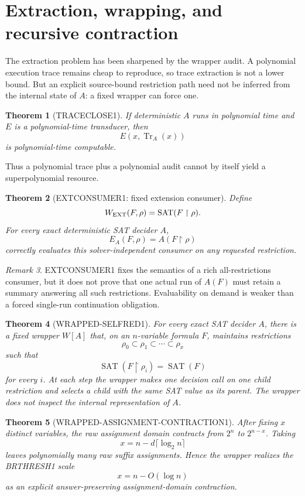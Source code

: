 \documentclass[11pt]{article}
\theoremstyle{plain}
\newtheorem{theorem}{Theorem}[section]
\theoremstyle{definition}
\theoremstyle{remark}
\newtheorem{remark}[theorem]{Remark}
\begin{document}
\section{Extraction, wrapping, and recursive contraction}

The extraction problem has been sharpened by the wrapper audit.  A polynomial
execution trace remains cheap to reproduce, so trace extraction is not a
lower bound.  But an explicit source-bound restriction path need not be
inferred from the internal state of \(A\): a fixed wrapper can force one.

\begin{theorem}[TRACECLOSE1]
If deterministic \(A\) runs in polynomial time and \(E\) is a polynomial-time
transducer, then
\[
E(x,\operatorname{Tr}_A(x))
\]
is polynomial-time computable.
\end{theorem}

Thus a polynomial trace plus a polynomial audit cannot by itself yield a
superpolynomial resource.

\begin{theorem}[EXTCONSUMER1: fixed extension consumer]
Define
\[
W_{\rm EXT}(F,\rho)
=
\operatorname{SAT}(F\upharpoonright\rho).
\]
For every exact deterministic SAT decider \(A\),
\[
E_A(F,\rho)=A(F\upharpoonright\rho)
\]
correctly evaluates this solver-independent consumer on any requested
restriction.
\end{theorem}

\begin{remark}
EXTCONSUMER1 fixes the semantics of a rich all-restrictions consumer, but it
does not prove that one actual run of \(A(F)\) must retain a summary answering
all such restrictions.  Evaluability on demand is weaker than a forced
single-run continuation obligation.
\end{remark}

\begin{theorem}[WRAPPED-SELFRED1]
For every exact SAT decider \(A\), there is a fixed wrapper \(W[A]\) that,
on an \(n\)-variable formula \(F\), maintains restrictions
\[
\rho_0\subset\rho_1\subset\cdots\subset\rho_x
\]
such that
\[
\operatorname{SAT}(F\upharpoonright\rho_i)
=
\operatorname{SAT}(F)
\]
for every \(i\).  At each step the wrapper makes one decision call on one
child restriction and selects a child with the same SAT value as its parent.
The wrapper does not inspect the internal representation of \(A\).
\end{theorem}

\begin{theorem}[WRAPPED-ASSIGNMENT-CONTRACTION1]
After fixing \(x\) distinct variables, the raw assignment domain contracts
from \(2^n\) to \(2^{n-x}\).  Taking
\[
x=n-d\lceil\log_2 n\rceil
\]
leaves polynomially many raw suffix assignments.  Hence the wrapper realizes
the BRTHRESH1 scale
\[
x=n-O(\log n)
\]
as an explicit answer-preserving \emph{assignment-domain} contraction.
\end{theorem}
\end{document}
